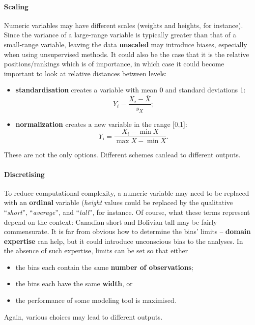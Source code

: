 \paragraph{Scaling} Numeric variables may have different scales (weights and heights, for instance). Since the variance of a large-range variable is typically greater than that of a small-range variable, leaving the data \textbf{unscaled} may introduce biases, especially when using unsupervised methods. It could also be the case that it is the relative positions/rankings which is of importance, in which case it could become important to look at relative distances between levels: 
\begin{itemize}[noitemsep]
\item \textbf{standardisation} creates a variable with mean 0 and standard deviations 1: $$Y_i=\frac{X_i-\overline{X}}{s_X};$$
\item \textbf{normalization} creates a new variable in the range [0,1]: $$Y_i=\frac{X_i-\min {X}}{\max X- \min X}.$$
\end{itemize}
These are not the only options. Different schemes canlead to different outputs. 
\paragraph{Discretising} To reduce computational complexity, a numeric variable may need to be replaced with an \textbf{ordinal} variable (\textit{height} values could be replaced by the qualitative ``\textit{short}'', ``\textit{average}'', and ``\textit{tall}'', for instance. Of course, what these terms represent depend on the context: Canadian short and Bolivian tall may be fairly commensurate.  It is far from obvious how to  determine the bins' limits  -- \textbf{domain expertise} can help, but it could introduce unconscious bias to the analyses. In the absence of such expertise, limits can be set so that either
\begin{itemize}[noitemsep]
\item the bins each contain the same \textbf{number of observations};
\item the bins each have the same \textbf{width}, or 
\item the performance of some modeling tool is maximised. 
\end{itemize}
Again, various choices may lead to different outputs. 
